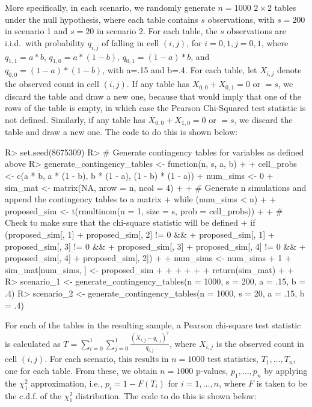 \documentclass[article]{jss}
\begin{document}
More specifically, in each scenario, we randomly generate $n=1000$ $2 \times 2$ tables under the null hypothesis, where each table contains $s$ observations, with $s=200$ in scenario 1 and $s=20$ in scenario 2.  For each table, the $s$ observations are i.i.d.\ with probability $q_{i,j}$ of falling in cell $(i,j)$, for $i=0,1, j=0,1$, where $q_{1,1} = a*b$, $q_{1,0} = a*(1-b)$, $q_{0,1} = (1-a)*b$, and $q_{0,0} = (1-a)*(1-b)$, with a=.15 and b=.4.  For each table, let $X_{i,j}$ denote the observed count in cell $(i,j)$.  If any table has $X_{0,0}+X_{0,1} = 0$ or $= s$, we discard the table and draw a new one, because that would imply that one of the rows of the table is empty, in which case the Pearson Chi-Squared test statistic is not defined.  Similarly, if any table has $X_{0,0}+X_{1,0} = 0$ or $=s$, we discard the table and draw a new one. The code to do this is shown below:
%
\begin{Schunk}
\begin{Sinput}
R> set.seed(8675309)
R> # Generate contingency tables for variables as defined above
R> generate_contingency_tables <- function(n, s, a, b) {
+    
+    cell_probs <- c(a * b, a * (1 - b), b * (1 - a), (1 - b) * (1 - a))
+    num_sims <- 0
+    sim_mat <- matrix(NA, nrow = n, ncol = 4)
+    
+    # Generate n simulations and append the contingency tables to a matrix
+    while (num_sims < n) {
+      
+      proposed_sim <- t(rmultinom(n = 1, size = s, prob = cell_probs))
+      
+      # Check to make sure that the chi-square statistic will be defined
+      if (proposed_sim[, 1] + proposed_sim[, 2] != 0 && 
+          proposed_sim[, 1] + proposed_sim[, 3] != 0 &&
+          proposed_sim[, 3] + proposed_sim[, 4] != 0 &&
+          proposed_sim[, 4] + proposed_sim[, 2]) {
+        
+        num_sims <- num_sims + 1
+        sim_mat[num_sims, ] <- proposed_sim
+        
+      }
+      
+    }
+    
+    return(sim_mat)
+    
+  }
R> scenario_1 <- generate_contingency_tables(n = 1000, s = 200, a = .15, b = .4)
R> scenario_2 <- generate_contingency_tables(n = 1000, s = 20, a = .15, b = .4)
\end{Sinput}
\end{Schunk}
%

For each of the tables in the resulting sample, a Pearson chi-square test statistic is calculated as $T = \sum_{i=0}^1\sum_{j=0}^1 \frac{(X_{i,j}-q_{i,j})^2}{q_{i,j}}$, where $X_{i,j}$ is the observed count in cell $(i,j)$.  For each scenario, this results in $n=1000$ test statistics, $T_1, \ldots, T_n$, one for each table.  From these, we obtain $n=1000$ p-values, $p_1, \ldots, p_n$ by applying the $\chi^2_1$ approximation, i.e., $p_i = 1-F(T_i)$ for $i=1,\ldots, n$, where $F$ is taken to be the c.d.f. of the $\chi^2_1$ distribution. The code to do this is shown below:
\end{document}
